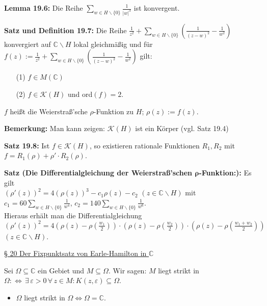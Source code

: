 \documentclass[11pt]{article}
\newcommand{\C}{\mathbb{C}}
\begin{document}
\textbf{Lemma 19.6:} Die Reihe $\sum_{w \in H\backslash \{ 0 \}} \frac{1}{|w|^3}$ ist konvergent.

\textbf{Satz und Definition 19.7:} Die Reihe $\frac{1}{z^2} + \sum_{w \in H\backslash \{ 0 \}} \left(\frac{1}{(z-w)^2} - \frac{1}{w^2}\right)$ konvergiert auf $\C \backslash H$ lokal gleichmäßig und für $f(z) := \frac{1}{z^2} + \sum_{w \in H\backslash \{ 0 \}} \left(\frac{1}{(z-w)^2} - \frac{1}{w^2}\right)$ gilt: 
\vspace{-0.6cm}
\begin{itemize}
\item[(1)] $f \in M(\C)$ \vspace{-0.2cm}
\item[(2)] $f\in \mathcal{K}(H)$ und ord$(f) = 2$. \vspace{-0.2cm}
\end{itemize}
\vspace{-0.3cm}
$f$ heißt die Weierstraß'sche $\rho$-Funktion zu $H$; $\rho(z) := f(z)$.

\textbf{Bemerkung:} Man kann zeigen: $\mathcal{K}(H)$ ist ein Körper (vgl. Satz 19.4)

\textbf{Satz 19.8:} Ist $f \in \mathcal{K}(H)$, so existieren rationale Funktionen $R_1, R_2$ mit $f = R_1(\rho) + \rho'\cdot R_2(\rho)$.

\newpage
\textbf{Satz (Die Differentialgleichung der Weierstraß'schen $\boldsymbol{\rho}$-Funktion:):} Es gilt \\
$(\rho'(z))^2 = 4(\rho(z))^3 - c_1 \rho(z) - c_2$ $(z \in \C \backslash H)$ mit $c_1 = 60 \sum_{w \in H \backslash \{ 0 \}} \frac{1}{w^4}$, $c_2 = 140 \sum_{w \in H \backslash \{ 0 \}} \frac{1}{w^6}$. \\
Hieraus erhält man die Differentialgleichung \\
$(\rho'(z))^2 = 4(\rho(z) - \rho(\frac{w_1}{2})) \cdot (\rho(z) - \rho(\frac{w_2}{2})) \cdot (\rho(z) - \rho(\frac{w_1 + w_2}{2}))$ $(z \in \C \backslash H)$. 

\underline{§ 20 Der Fixpunktsatz von Earle-Hamilton in $\C$}

Sei $\Omega \subseteq \C$ ein Gebiet und $M \subseteq \Omega$. Wir sagen: $M$ liegt strikt in $\Omega :\Leftrightarrow \, \exists \, \varepsilon > 0 \, \forall \, z \in M \colon K(z, \varepsilon) \subseteq \Omega$. 
\vspace{-0.6cm}
\begin{itemize}
\item $\Omega$ liegt strikt in $\Omega \Leftrightarrow \Omega = \C$.
\end{itemize}
\vspace{-0.3cm}
\end{document}
